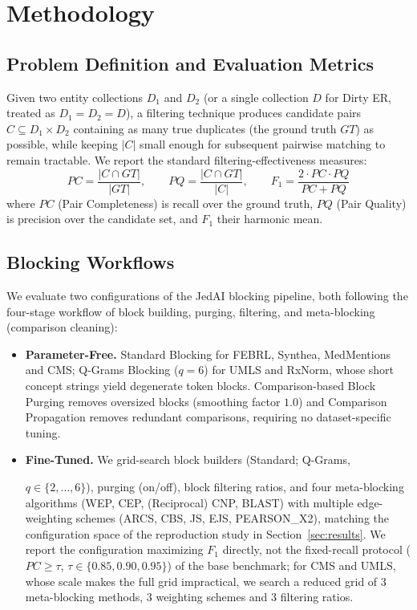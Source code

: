 \documentclass[runningheads]{llncs}
\begin{document}
\section{Methodology}
\label{sec:methodology}

\subsection{Problem Definition and Evaluation Metrics}

Given two entity collections $D_1$ and $D_2$ (or a single collection $D$ for Dirty ER, treated
as $D_1 = D_2 = D$), a filtering technique produces candidate pairs $C \subseteq D_1 \times
D_2$ containing as many true duplicates (the ground truth $GT$) as possible, while keeping
$|C|$ small enough for subsequent pairwise matching to remain tractable. We report the standard
filtering-effectiveness measures:
\begin{equation}
PC = \frac{|C \cap GT|}{|GT|}, \qquad
PQ = \frac{|C \cap GT|}{|C|}, \qquad
F_1 = \frac{2 \cdot PC \cdot PQ}{PC + PQ}
\end{equation}
where $PC$ (Pair Completeness) is recall over the ground truth, $PQ$ (Pair Quality) is
precision over the candidate set, and $F_1$ their harmonic mean.

\subsection{Blocking Workflows}
\label{sec:methodology-blocking}

We evaluate two configurations of the JedAI blocking pipeline, both following the four-stage
workflow of block building, purging, filtering, and meta-blocking (comparison cleaning):
\begin{itemize}
    \item \textbf{Parameter-Free.} Standard Blocking for FEBRL, Synthea, MedMentions and CMS;
    Q-Grams Blocking ($q=6$) for UMLS and RxNorm, whose short concept strings yield degenerate
    token blocks. Comparison-based Block Purging removes oversized blocks (smoothing factor
    $1.0$) and Comparison Propagation removes redundant comparisons, requiring no
    dataset-specific tuning.
    \item \textbf{Fine-Tuned.} We grid-search block builders (Standard; Q-Grams,
    
    $q \in \{2,\ldots,6\}$), purging (on/off), block filtering ratios, and four meta-blocking
    algorithms (WEP, CEP, (Reciprocal) CNP, BLAST) with multiple edge-weighting schemes (ARCS,
    CBS, JS, EJS, PEARSON\_X2), matching the configuration space of the reproduction study in
    Section~\ref{sec:results}. We report the configuration maximizing $F_1$ directly, not the
    fixed-recall protocol ($PC \geq \tau$, $\tau \in \{0.85, 0.90, 0.95\}$) of the base
    benchmark; for CMS and UMLS, whose scale makes the full grid impractical, we search a
    reduced grid of 3 meta-blocking methods, 3 weighting schemes and 3 filtering ratios.
\end{itemize}
\end{document}
